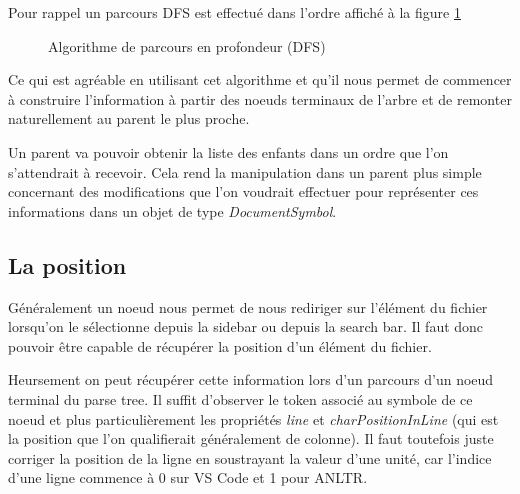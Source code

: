 \documentclass[
    iict, %
    il, %
]{heig-tb}
\begin{document}
Pour rappel un parcours DFS est effectué dans l'ordre affiché à la figure \ref*{Algorithme de parcours en profondeur (DFS)}

\begin{figure}[!h]
    \begin{center}
    \end{center}
    \caption[Algorithme de parcours en profondeur (DFS)]{\label{Algorithme de parcours en profondeur (DFS)} Algorithme de parcours en profondeur (DFS)}
\end{figure}

Ce qui est agréable en utilisant cet algorithme et qu'il nous permet de commencer à construire l'information à partir des noeuds terminaux
de l'arbre et de remonter naturellement au parent le plus proche.

Un parent va pouvoir obtenir la liste des enfants dans un ordre que l'on s'attendrait à recevoir.
Cela rend la manipulation dans un parent plus simple concernant des modifications que l'on voudrait effectuer pour représenter ces informations
dans un objet de type \emph{DocumentSymbol}.

\subsection{La position}

Généralement un noeud nous permet de nous rediriger sur l'élément du fichier lorsqu'on le sélectionne depuis la sidebar ou depuis la search bar. %
Il faut donc pouvoir être capable de récupérer la position d'un élément du fichier.

Heursement on peut récupérer cette information lors d'un parcours d'un noeud terminal du parse tree.
Il suffit d'observer le token associé au symbole de ce noeud et plus particulièrement les
propriétés \emph{line} et \emph{charPositionInLine} (qui est la position que l'on qualifierait généralement de colonne).
Il faut toutefois juste corriger la position de la ligne en soustrayant la valeur d'une unité, car l'indice d'une ligne commence à 0 sur VS Code et 1 pour ANLTR.
\end{document}

